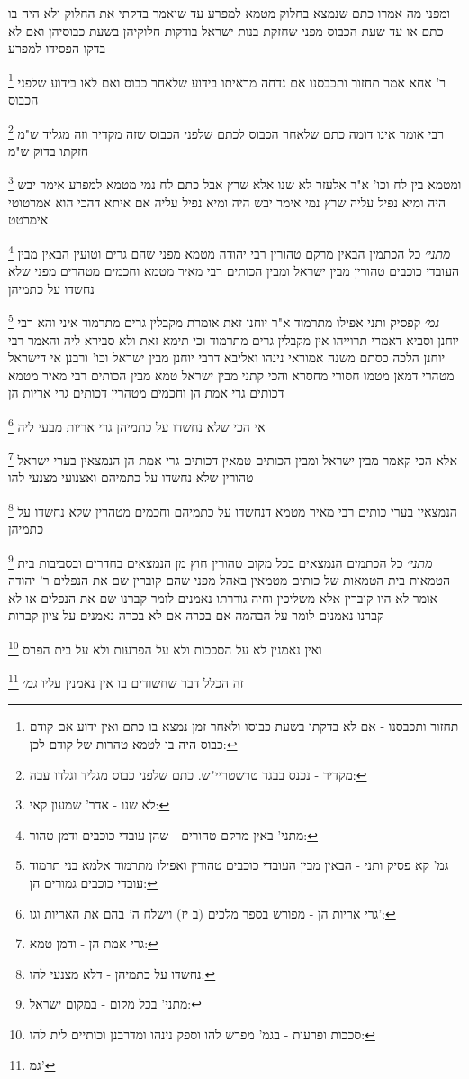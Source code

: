 \documentclass[12pt, openany]{book}
\newcommand{\footnotecomment}[1]{
	\renewcommand\thefootnote{}
	\footnote{#1}}
\newcommand{\commenta}[1]{\footnotecomment{#1}}
\begin{document}
{ומפני מה אמרו כתם שנמצא בחלוק מטמא למפרע עד שיאמר בדקתי את החלוק ולא היה בו כתם או עד שעת הכבוס מפני שחזקת בנות ישראל בודקות חלוקיהן בשעת כבוסיהן ואם לא בדקו הפסידו למפרע 
\commenta{תחזור ותכבסנו - אם לא בדקתו בשעת כבוסו ולאחר זמן נמצא בו כתם ואין ידוע אם קודם כבוס היה בו לטמא טהרות של קודם לכן:}
ר' אחא אמר תחזור ותכבסנו אם נדחה מראיתו בידוע שלאחר כבוס ואם לאו בידוע שלפני הכבוס 
\commenta{מקדיר - נכנס בבגד טרשטריי"ש. כתם שלפני כבוס מגליד וגלדו עבה:}
רבי אומר אינו דומה כתם שלאחר הכבוס לכתם שלפני הכבוס שזה מקדיר וזה מגליד ש"מ חזקתו בדוק ש"מ
\commenta{לא שנו - אדר' שמעון קאי:}
ומטמא בין לח וכו' א"ר אלעזר לא שנו אלא שרץ אבל כתם לח נמי מטמא למפרע אימר יבש היה ומיא נפיל עליה 
שרץ נמי אימר יבש היה ומיא נפיל עליה אם איתא דהכי הוא אמרטוטי אימרטט
\commenta{מתני' באין מרקם טהורים - שהן עובדי כוכבים ודמן טהור:}
{\large\emph{מתני׳}} כל הכתמין הבאין מרקם טהורין רבי יהודה מטמא מפני שהם גרים וטועין הבאין מבין העובדי כוכבים טהורין מבין ישראל ומבין הכותים רבי מאיר מטמא וחכמים מטהרים מפני שלא נחשדו על כתמיהן
\commenta{גמ' קא פסיק ותני - הבאין מבין העובדי כוכבים טהורין ואפילו מתרמוד אלמא בני תרמוד עובדי כוכבים גמורים הן:}
{\large\emph{גמ׳}} קפסיק ותני אפילו מתרמוד א"ר יוחנן זאת אומרת מקבלין גרים מתרמוד 
איני והא רבי יוחנן וסביא דאמרי תרוייהו אין מקבלין גרים מתרמוד 
וכי תימא זאת ולא סבירא ליה והאמר רבי יוחנן הלכה כסתם משנה 
אמוראי נינהו ואליבא דרבי יוחנן
מבין ישראל וכו' ורבנן אי דישראל מטהרי דמאן מטמו 
חסורי מחסרא והכי קתני מבין ישראל טמא מבין הכותים רבי מאיר מטמא דכותים גרי אמת הן וחכמים מטהרין דכותים גרי אריות הן 
\commenta{גרי אריות הן - מפורש בספר מלכים (ב יז) וישלח ה' בהם את האריות וגו':
}
אי הכי שלא נחשדו על כתמיהן גרי אריות מבעי ליה 
\commenta{גרי אמת הן - ודמן טמא:}
אלא הכי קאמר מבין ישראל ומבין הכותים טמאין דכותים גרי אמת הן הנמצאין בערי ישראל טהורין שלא נחשדו על כתמיהם ואצנועי מצנעי להו 
\commenta{נחשדו על כתמיהן - דלא מצנעי להו:
}
הנמצאין בערי כותים רבי מאיר מטמא דנחשדו על כתמיהם וחכמים מטהרין שלא נחשדו על כתמיהן 
\commenta{מתני' בכל מקום - במקום ישראל:}
{\large\emph{מתני׳}} כל הכתמים הנמצאים בכל מקום טהורין חוץ מן הנמצאים בחדרים ובסביבות בית הטמאות
בית הטמאות של כותים מטמאין באהל מפני שהם קוברין שם את הנפלים ר' יהודה אומר לא היו קוברין אלא משליכין וחיה גוררתו 
נאמנים לומר קברנו שם את הנפלים או לא קברנו נאמנים לומר על הבהמה אם בכרה אם לא בכרה נאמנים על ציון קברות
\commenta{סככות ופרעות - בגמ' מפרש להו וספק נינהו ומדרבנן וכותיים לית להו:}
ואין נאמנין לא על הסככות ולא על הפרעות ולא על בית הפרס 
\commenta{ גמ'}
זה הכלל דבר שחשודים בו אין נאמנין עליו {\large\emph{גמ׳}} }
\end{document}
